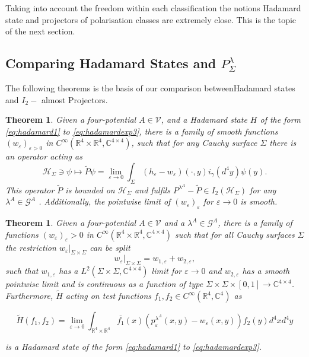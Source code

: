\documentclass[b5paper,draft,openbib,12pt]{memoir}
\newtheorem{Thm}[Def]{Theorem}
\begin{document}
Taking into account the freedom within each classification the notions Hadamard state and  projectors of polarisation classes are extremely close. 
This is the topic of the next section.


\subsection{Comparing Hadamard States and \(P^\lambda_\Sigma\)}\label{sec:comparison hadamard pol}

The following theorems is the basis of our comparison 
between\linebreak Hadamard states and \(I_2-\) almost Projectors. 


\begin{Thm}\label{thm:hadamard=>Pol}
Given a four-potential \(A\in \mathcal{V}\), and a Hadamard state \(H\) of the form 
\eqref{eq:hadamard1} to \eqref{eq:hadamardexp3}, there is a family of smooth functions 
\((w_\varepsilon)_{\varepsilon>0}\) in 
\( C^\infty(\mathbb{R}^4\times \mathbb{R}^4,\mathbb{C}^{4\times 4})\), such that for any Cauchy surface 
\(\Sigma\) there is an operator  acting as
\begin{equation}
\mathcal{H}_{\Sigma} \ni \psi \mapsto \tilde{P}\psi= \lim_{\varepsilon \rightarrow 0} \int_{\Sigma} (h_\varepsilon - w_\varepsilon)(\cdot,y)i_{\gamma}(d^4y) \psi(y).
\end{equation}
This operator \(\tilde{P}\) is bounded on 
\(\mathcal{H}_\Sigma\) and fulfils 
\(P^{\lambda^A}-\tilde{P}\in I_2(\mathcal{H}_\Sigma)\) 
for any \(\lambda^A\in \mathcal{G}^A\) . 
Additionally, the pointwise limit of 
\((w_\varepsilon)_{\varepsilon}\) for 
\(\varepsilon \rightarrow 0\) is smooth.
\end{Thm}

\begin{Thm}\label{thm:Pol=>hadamard}
Given a four-potential \(A\in \mathcal{V}\) and a \(\lambda^A\in\mathcal{G}^A\), there is a family of functions
\((w_\varepsilon)_\varepsilon>0\) in \( C^\infty(\mathbb{R}^4 \times \mathbb{R}^4 ,\mathbb{C}^{4\times 4})\) such that for all Cauchy surfaces \(\Sigma\)
the restriction \(w_\varepsilon|_{\Sigma\times\Sigma}\) can be 
split
\begin{equation}
  w_\varepsilon|_{\Sigma\times\Sigma}=w_{1,\varepsilon}+w_{2,\varepsilon},
\end{equation}
such that \(w_{1,\varepsilon}\) has a \(L^2(\Sigma\times\Sigma,\mathbb{C}^{4\times4})\) 
limit for \(\varepsilon\rightarrow 0\) and 
\(w_{2,\varepsilon}\) has a smooth pointwise limit and  is continuous 
as a function of type \(\Sigma\times\Sigma\times[0,1]\rightarrow \mathbb{C}^{4\times 4}\). 
Furthermore, \(\tilde{H}\) acting on test functions \(f_1,f_2\in C^\infty(\mathbb{R}^{4}, \mathbb{C}^4)\) as

\begin{equation}
\tilde{H}(f_1,f_2)=\lim_{\varepsilon \rightarrow 0} \int_{\mathbb{R}^{4}\times\mathbb{R}^4} \overline{f_1}(x)
\left(p_\varepsilon^{\lambda^A}(x,y)-w_\varepsilon(x,y)\right)f_2(y) d^4x d^4y
\end{equation}

is a Hadamard state of the form \eqref{eq:hadamard1} to \eqref{eq:hadamardexp3}.
\end{Thm}
\end{document}
